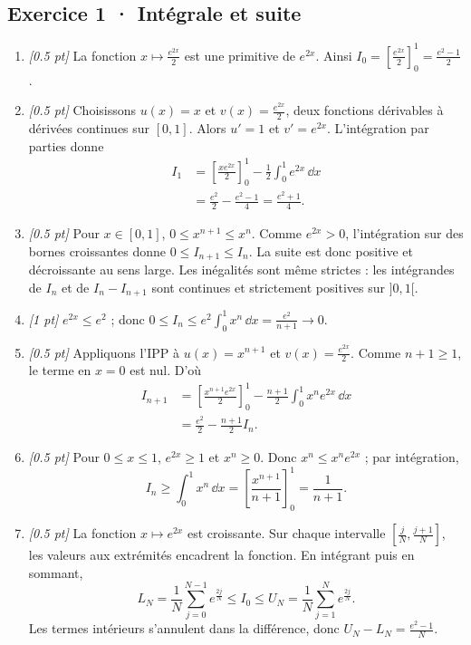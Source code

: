 \subsection*{Exercice 1 · Intégrale et suite}\begin{enumerate}

\item \textit{[\num{0,5} pt]} La fonction $x\mapsto \frac{e^{2x}}{2}$ est une primitive de $e^{2x}$. Ainsi $I_0=[\frac{e^{2x}}{2}]_0^1=\frac{e^{2}-1}{2}$.

\item \textit{[\num{0,5} pt]} Choisissons $u(x)=x$ et $v(x)=\frac{e^{2x}}{2}$, deux fonctions dérivables à dérivées continues sur $[0,1]$. Alors $u'=1$ et $v'=e^{2x}$. L'intégration par parties donne
\[\begin{aligned}I_1&=\left[\frac{xe^{2x}}{2}\right]_0^1-\frac{1}{2}\int_0^1e^{2x}\,\dd x\\&=\frac{e^{2}}{2}-\frac{e^{2}-1}{4}=\frac{e^{2}+1}{4}.\end{aligned}\]

\item \textit{[\num{0,5} pt]} Pour $x\in[0,1]$, $0\le x^{n+1}\le x^n$. Comme $e^{2x}>0$, l'intégration sur des bornes croissantes donne $0\le I_{n+1}\le I_n$. La suite est donc positive et décroissante au sens large. Les inégalités sont même strictes : les intégrandes de $I_n$ et de $I_n-I_{n+1}$ sont continues et strictement positives sur $]0,1[$.

\item \textit{[1 pt]} $e^{2x}\le e^{2}$ ; donc $0\le I_n\le e^{2}\int_0^1x^n\,\dd x=\frac{e^{2}}{n+1}\to0$.

\item \textit{[\num{0,5} pt]} Appliquons l'IPP à $u(x)=x^{n+1}$ et $v(x)=\frac{e^{2x}}{2}$. Comme $n+1\ge1$, le terme en $x=0$ est nul. D'où
\[\begin{aligned}I_{n+1}&=\left[\frac{x^{n+1}e^{2x}}{2}\right]_0^1-\frac{n+1}{2}\int_0^1x^ne^{2x}\,\dd x\\&=\frac{e^{2}}{2}-\frac{n+1}{2}I_n.\end{aligned}\]

\item \textit{[\num{0,5} pt]} Pour $0\le x\le1$, $e^{2x}\ge1$ et $x^n\ge0$. Donc $x^n\le x^ne^{2x}$ ; par intégration,
\[I_n\ge\int_0^1x^n\,\dd x=\left[\frac{x^{n+1}}{n+1}\right]_0^1=\frac{1}{n+1}.\]

\item \textit{[\num{0,5} pt]} La fonction $x\mapsto e^{2x}$ est croissante. Sur chaque intervalle $[\frac{j}{N},\frac{j+1}{N}]$, les valeurs aux extrémités encadrent la fonction. En intégrant puis en sommant,
\[L_N=\frac{1}{N}\sum_{j=0}^{N-1}e^{\frac{2j}{N}}\le I_0\le U_N=\frac{1}{N}\sum_{j=1}^Ne^{\frac{2j}{N}}.\]
Les termes intérieurs s'annulent dans la différence, donc $U_N-L_N=\frac{e^{2}-1}{N}$.


\end{enumerate}
